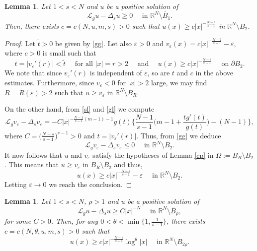 \documentclass[10pt,a4paper]{amsart}
\numberwithin{equation}{section}
\newcommand{\R}{\mathbb R}
\newcommand{\Ro}{\mathbb R^N\setminus \overline B_1}
\newcommand{\Lg}{{\mathcal L}_g}
\newtheorem{lemma}[theorem]{Lemma}
\begin{document}
\begin{lemma}\label{ls}
Let $1<s<N$ and $u$ be a positive solution of 
$$
\Lg u-\Delta_s u\geq 0\quad\mbox{ in }\Ro.
$$ 
Then, there exists $c=c(N, u, m,s)>0$ such that $u(x)\geq c|x|^{-\frac{N-s}{s-1}}$ in $\R^N\setminus B_{2}$.
\end{lemma}
\begin{proof} Let $\tilde t>0$ be given by \eqref{gg}. 
Let also $\varepsilon>0$ and $v_\varepsilon(x)=c|x|^{-\frac{N-2}{s-1}}-\varepsilon$, where $c>0$ is small such that
$$
t=|v_\varepsilon'(r)|<\tilde t\quad\mbox{ for all }|x|=r>2\quad \mbox{ and  }\quad u(x)\geq c|x|^{-\frac{N-s}{s-1}} \quad\mbox{ on }\partial B_{2}.
$$
We note that since $v_\varepsilon'(r)$ is independent of $\varepsilon$, so are $t$ and $c$ in the above estimates.
Furthermore, since $v_\varepsilon<0$ for $|x|>2$ large, we may find $R=R(\varepsilon)>2$ such that $u\geq v_\varepsilon$ in $\R^N\setminus B_R$. 

On the other hand, from \eqref{sl} and \eqref{gl}  we compute
$$
\Lg v_\varepsilon-\Delta_s v_\varepsilon=-C|x|^{-\frac{N-1}{s-1}(m-1)-1}g(t)\Big\{\frac{N-1}{s-1}\Big(m-1+\frac{tg'(t)}{g(t)}\Big)-(N-1)\Big\},
$$
where $C=\Big(\frac{N-s}{s-1}\Big)^{s-1}>0$ and $t=|v_\varepsilon'(r)|$. Thus, from \eqref{gg} we deduce 
$$
\Lg v_\varepsilon-\Delta_s v_\varepsilon\leq 0\quad\mbox{ in }\R^N\setminus B_2.
$$ 
It now follows that $u$ and $v_\varepsilon$ satisfy the hypotheses of Lemma \ref{cp} in $\Omega:=B_R\setminus B_2$. This means that $u\geq v_\varepsilon$ in $B_R\setminus B_2$ and thus,
$$
u(x)\geq  c|x|^{-\frac{N-s}{s-1}}-\varepsilon\quad\mbox{ in }\R^N\setminus B_2.
$$ 
Letting $\varepsilon\to 0$ we reach the conclusion.
\end{proof}



\begin{lemma}\label{ls1}
Let $1<s<N$, $\rho>1$ and $u$ be a positive solution of 
$$
\Lg u-\Delta_s u\geq C|x|^{-N} \quad\mbox{ in }\R^N\setminus \overline B_\rho,
$$ 
for some $C>0$.
Then, for any $0<\theta<\min\{1,\frac{1}{s-1}\}$, there exists $c=c(N, \theta, u,  m,s)>0$ such that 
$$
u(x)\geq c|x|^{-\frac{N-s}{s-1}}\log^\theta |x|\quad\mbox{ in }\R^N\setminus B_{2\rho}.
$$
\end{lemma}
\end{document}
